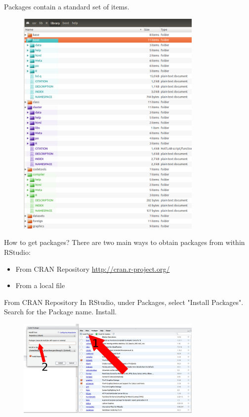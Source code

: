 \documentclass{beamer}\usepackage[]{graphicx}\usepackage[]{color}
\begin{document}
\begin{frame}[fragile]{Packages contain a standard set of items.}
\begin{figure}[ht!]
\centering
\includegraphics[width=90mm]{pictures/library_screenCap_colorized.jpg}
\label{overflow}
\end{figure}
\end{frame}


\begin{frame}[fragile]{How to get packages?}
There are two main ways to obtain packages from within RStudio:
\begin{itemize}
\item From CRAN Repository \url{http://cran.r-project.org/}
\item From a local file
\end{itemize}

\end{frame}

\begin{frame}[fragile]{From CRAN Repository}
In RStudio, under Packages, select "Install Packages". Search for the Package name. Install.
\begin{figure}[ht!]
\centering
\includegraphics[width=90mm]{pictures/package_install_CRAN.jpg}
\label{overflow}
\end{figure}
\end{frame}
\end{document}
